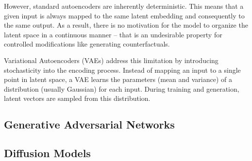 However, standard autoencoders are inherently deterministic.
This means that a given input is always mapped to the same latent embedding
and consequently to the same output. As a result, there is no motivation
for the model to organize the latent space in a continuous manner -- that is an undesirable
property for controlled modifications like generating counterfactuals.

Variational Autoencoders (VAEs) \cite{kingma2019introduction} address this limitation by introducing stochasticity
into the encoding process. Instead of mapping an input to a single point in latent space,
a VAE learns the parameters (mean and variance) of a distribution (usually Gaussian) for each input.
During training and generation, latent vectors are sampled from this distribution.


\cite{downs2020cruds}

\cite{pawelczyk2020learning}

\subsection{Generative Adversarial Networks}


\cite{singla2023explaining}

\cite{rossi2024tace}

\subsection{Diffusion Models}


\cite{atad2024counterfactual}

\cite{vzigutyte2025counterfactual}